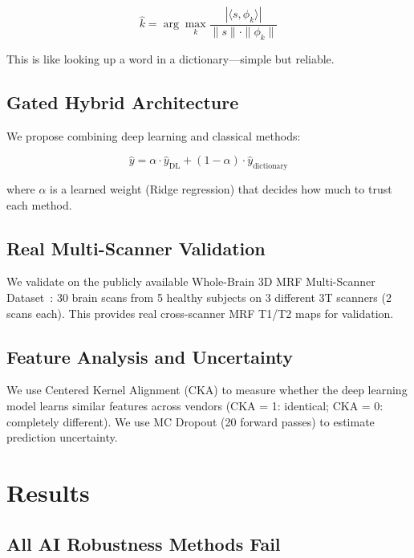 \documentclass[11pt,a4paper]{article}
\begin{document}
\begin{equation}
  \hat{k} = \arg\max_k \frac{|\langle s, \phi_k \rangle|}
    {\|s\| \cdot \|\phi_k\|}
\end{equation}

This is like looking up a word in a dictionary---simple but reliable.

\subsection{Gated Hybrid Architecture}

We propose combining deep learning and classical methods:

\begin{equation}
  \hat{y} = \alpha \cdot \hat{y}_{\text{DL}} + (1-\alpha) \cdot
  \hat{y}_{\text{dictionary}}
\end{equation}

where $\alpha$ is a learned weight (Ridge regression) that decides how
much to trust each method.

\subsection{Real Multi-Scanner Validation}

We validate on the publicly available Whole-Brain 3D MRF Multi-Scanner
Dataset~\cite{zhao2023multiscanner}: 30 brain scans from 5 healthy
subjects on 3 different 3T scanners (2 scans each). This provides real
cross-scanner MRF T1/T2 maps for validation.

\subsection{Feature Analysis and Uncertainty}

We use Centered Kernel Alignment (CKA) to measure whether the deep learning model
learns similar features across vendors (CKA = 1: identical; CKA = 0:
completely different). We use MC Dropout (20 forward passes) to
estimate prediction uncertainty.


\section{Results}
\label{sec:results}

\subsection{All AI Robustness Methods Fail}
\end{document}
